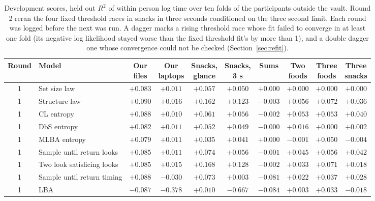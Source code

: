 \begin{table}[p]
\centering
\scriptsize
\setlength{\tabcolsep}{2.6pt}
\caption{Development scores, held out $R^2$ of within person log time over ten folds of the participants outside the vault. Round 2 reran the four fixed threshold races in snacks in three seconds conditioned on the three second limit. Each round was logged before the next was run. A dagger marks a rising threshold race whose fit failed to converge in at least one fold (its negative log likelihood stayed worse than the fixed threshold fit's by more than 1), and a double dagger one whose convergence could not be checked (Section~\ref{sec:refit}).}
\label{tab:dev}
\begin{tabular}{c>{\raggedright\arraybackslash}p{4.6cm}cccccccc}
\toprule
Round & Model & \makecell{Our\\files} & \makecell{Our\\laptops} & \makecell{Snacks,\\glance} & \makecell{Snacks,\\3 s} & Sums & \makecell{Two\\foods} & \makecell{Three\\foods} & \makecell{Three\\snacks} \\
\midrule
1 & Set size law & $+0.083$ & $+0.011$ & $+0.057$ & $+0.050$ & $+0.000$ & $+0.000$ & $+0.000$ & $+0.000$ \\
1 & Structure law & $+0.090$ & $+0.016$ & $+0.162$ & $+0.123$ & $-0.003$ & $+0.056$ & $+0.072$ & $+0.036$ \\
1 & CL entropy & $+0.088$ & $+0.010$ & $+0.061$ & $+0.056$ & $-0.002$ & $+0.053$ & $+0.053$ & $+0.040$ \\
1 & DbS entropy & $+0.082$ & $+0.011$ & $+0.052$ & $+0.049$ & $-0.000$ & $+0.016$ & $+0.000$ & $+0.002$ \\
1 & MLBA entropy & $+0.079$ & $+0.011$ & $+0.035$ & $+0.041$ & $+0.000$ & $-0.001$ & $+0.050$ & $-0.004$ \\
1 & Sample until return looks & $+0.085$ & $+0.011$ & $+0.074$ & $+0.056$ & $-0.001$ & $+0.045$ & $+0.056$ & $+0.042$ \\
1 & Two look satisficing looks & $+0.085$ & $+0.015$ & $+0.168$ & $+0.128$ & $-0.002$ & $+0.033$ & $+0.071$ & $+0.018$ \\
1 & Sample until return timing & $+0.088$ & $-0.030$ & $+0.073$ & $+0.003$ & $-0.081$ & $+0.022$ & $+0.037$ & $+0.028$ \\
1 & LBA & $-0.087$ & $-0.378$ & $+0.010$ & $-0.667$ & $-0.084$ & $+0.003$ & $+0.033$ & $-0.018$ \\

\end{tabular}
\end{table}
